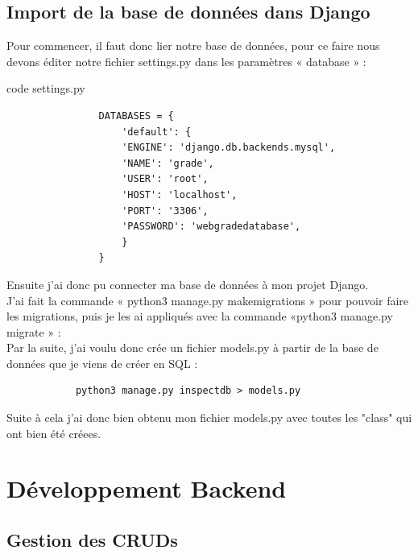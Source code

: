 \documentclass[12pt, a4paper]{article}
\begin{document}
        \subsection{Import de la base de données dans Django}
        Pour commencer, il faut donc lier notre base de données, pour ce faire nous devons éditer notre fichier settings.py dans les paramètres « database » :
        \begin{listing}[H]
            \caption{code settings.py}
            \label{lst:settings}
            \begin{verbatim}
                DATABASES = {
                    'default': {
                    'ENGINE': 'django.db.backends.mysql',
                    'NAME': 'grade', 
                    'USER': 'root',
                    'HOST': 'localhost',
                    'PORT': '3306',
                    'PASSWORD': 'webgradedatabase',
                    }
                }
            \end{verbatim}
        \end{listing}
        Ensuite j’ai donc pu connecter ma base de données à mon projet Django. 
        \\J’ai fait la commande « python3 manage.py makemigrations » pour pouvoir faire les migrations, puis je les ai appliqués avec la commande «python3 manage.py migrate » :
        \\[1cm]Par la suite, j'ai voulu donc crée un fichier models.py à partir de la base de données que je viens de créer en SQL :
        \begin{verbatim}
            python3 manage.py inspectdb > models.py
        \end{verbatim}
        Suite à cela j'ai donc bien obtenu mon fichier models.py avec toutes les "class" qui ont bien été créees.
    \newpage
    \section{Développement Backend}
        \subsection{Gestion des CRUDs}
\end{document}
